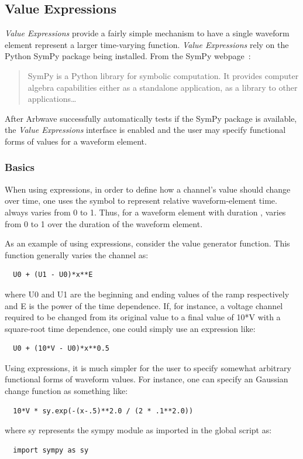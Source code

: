 \subsection{Value Expressions}\label{sec:waveforms:expr}
\textit{Value Expressions} provide a fairly simple mechanism to have a single
waveform element represent a larger time-varying function.  \textit{Value
Expressions} rely on the Python SymPy package being installed.  From the SymPy
webpage~\cite{sympy}:
\begin{quote}
SymPy is a Python library for symbolic computation. It provides computer algebra
capabilities either as a standalone application, as a library to other
applications\ldots
\end{quote}
After Arbwave successfully automatically tests if the SymPy package is
available, the \textit{Value Expressions} interface is enabled and the user may
specify functional forms of values for a waveform element.

\subsubsection{Basics}

When using expressions, in
order to define how a channel's value should change over time, one uses the
symbol  to represent relative waveform-element time.
 always varies
from 0 to 1.  Thus, for a waveform element with duration ,
 varies from 0 to 1
over the duration of the waveform element.

As an example of using expressions, consider the  value generator
function.  This function generally varies the channel as:
%
\begin{lstlisting}
  U0 + (U1 - U0)*x**E
\end{lstlisting}
%
where U0 and U1 are the beginning and ending values of the ramp respectively and
E is the power of the time dependence.  If, for instance, a voltage channel
required to be changed from its original value to a final value of 10*V with a
square-root time dependence, one could simply use an expression like:
%
\begin{lstlisting}
  U0 + (10*V - U0)*x**0.5
\end{lstlisting}
%
Using expressions, it is much simpler for the user to specify somewhat arbitrary
functional forms of waveform values.  For instance, one can specify an Gaussian
change function as something like:
%
\begin{lstlisting}
  10*V * sy.exp(-(x-.5)**2.0 / (2 * .1**2.0))
\end{lstlisting}
%
where sy represents the sympy module as imported in the global script as:
\begin{lstlisting}
  import sympy as sy
\end{lstlisting}

